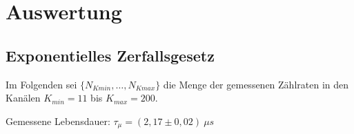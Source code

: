 \section{Auswertung}
	\subsection{Exponentielles Zerfallsgesetz}
	Im Folgenden sei $\{N_{Kmin},\dots,N_{Kmax}\}$ die Menge der gemessenen Zählraten in den Kanälen $K_{min} = 11$ bis $ K_{max} = 200$.
	
	Gemessene Lebensdauer: $\tau_\mu = (2,17 \pm 0,02)\ \unit{\mu s}$
   